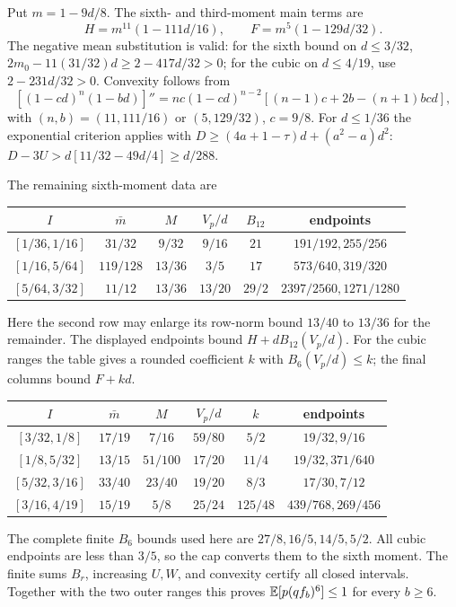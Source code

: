 Put $m=1-9d/8$. The sixth- and third-moment main terms are
\[
 H=m^{11}(1-111d/16),\qquad F=m^5(1-129d/32).
\]
The negative mean substitution is valid: for the sixth bound on
$d\le3/32$, $2m_0-11(31/32)d\ge2-417d/32>0$;
for the cubic on $d\le4/19$, use $2-231d/32>0$.
Convexity follows from
\[
 [(1-cd)^n(1-bd)]''=nc(1-cd)^{n-2}[(n-1)c+2b-(n+1)bcd],
\]
with $(n,b)=(11,111/16)$ or $(5,129/32)$, $c=9/8$.
For $d\le1/36$ the exponential criterion applies with
$D\ge(4a+1-\tau)d+(a^2-a)d^2$:
$D-3U>d[11/32-49d/4]\ge d/288$.

The remaining sixth-moment data are
\begin{center}\small
\begin{tabular}{@{}cccccc@{}}\toprule
$I$&$\bar m$&$M$&$V_p/d$&$B_{12}$&endpoints\\\midrule
$[1/36,1/16]$&$31/32$&$9/32$&$9/16$&$21$&$191/192,255/256$\\
$[1/16,5/64]$&$119/128$&$13/36$&$3/5$&$17$&$573/640,319/320$\\
$[5/64,3/32]$&$11/12$&$13/36$&$13/20$&$29/2$&$2397/2560,1271/1280$\\\bottomrule
\end{tabular}
\end{center}
Here the second row may enlarge its row-norm bound $13/40$ to $13/36$
for the remainder. The displayed endpoints bound $H+dB_{12}(V_p/d)$.
For the cubic ranges the table gives a rounded coefficient $k$ with
$B_6(V_p/d)\le k$; the final columns bound $F+kd$.
\begin{center}\small
\begin{tabular}{@{}cccccc@{}}\toprule
$I$&$\bar m$&$M$&$V_p/d$&$k$&endpoints\\\midrule
$[3/32,1/8]$&$17/19$&$7/16$&$59/80$&$5/2$&$19/32,9/16$\\
$[1/8,5/32]$&$13/15$&$51/100$&$17/20$&$11/4$&$19/32,371/640$\\
$[5/32,3/16]$&$33/40$&$23/40$&$19/20$&$8/3$&$17/30,7/12$\\
$[3/16,4/19]$&$15/19$&$5/8$&$25/24$&$125/48$&$439/768,269/456$\\\bottomrule
\end{tabular}
\end{center}
The complete finite $B_6$ bounds used here are $27/8,16/5,14/5,5/2$.
All cubic endpoints are less than $3/5$, so the cap converts them to the
sixth moment. The finite sums $B_r$, increasing $U,W$, and convexity
certify all closed intervals. Together with the two outer ranges this
proves $\mathbb E[p(qf_b)^6]\le1$ for every $b\ge6$.
